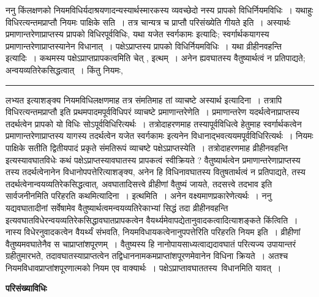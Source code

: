 \documentclass[11pt, openany]{book}
\begin{document}
 {\br ननु} किंलक्षणको नियमविधिर्यदाश्रयणादन्यस्यार्थस्मारकस्य व्यवच्छेदो
\newpage
\fancyhead[LO]{विधिः ]}
{\bl\noindent नस्य प्रापको विधिर्नियमविधिः~। यथाहुः {\qtl विधिरत्यन्तमप्राप्तौ नियमः पाक्षिके सति~। तत्र चान्यत्र च प्राप्तौ परिसंख्येति गीयते} इति~। अस्यार्थः {\qtl प्रमाणान्तरेणाप्राप्तस्य प्रापको विधिरपूर्वविधिः}, यथा {\qtl यजेत स्वर्गकामः} इत्यादिः; स्वर्गार्थकयागस्य प्रमाणान्तरेणाप्राप्तस्यानेन विधानात्~। पक्षेऽप्राप्तस्य प्रापको विधिर्नियमविधिः~। यथा {\qtl व्रीहीनवहन्ति} इत्यादिः~। कथमस्य पक्षेऽप्राप्तप्रापकत्वमिति चेत् , {\qtl इत्थम्}~। अनेन ह्यवघातस्य वैतुष्यार्थत्वं न प्रतिपाद्यते; अन्वयव्यतिरेकसिद्धत्वात्~। किंतु नियमः, \\}
\hrule
\vspace{3mm}
\noindent
लभ्यत इत्याशङ्क्य नियमविधिलक्षणमाह तत्र संमतिमाह तां व्याचष्टे {\br अस्यार्थ इत्यादिना~।}
तत्रापि {\qt विधिरत्यन्तमप्राप्तौ} इति प्रथमपादमपूर्वविधिपरं व्याचष्टे {\br प्रमाणान्तरेणेति~।} प्रमाणान्तरेण यदर्थत्वेनाप्राप्तस्य तदर्थत्वेन प्रापको यो विधिः सोऽपूर्वविधिरित्यर्थः~। तत्रोदाहरणमाह तस्यापूर्वविधित्वे हेतुमाह स्वर्गार्थकत्वेन प्रमाणान्तरेणाप्राप्तस्य यागस्य तदर्थत्वेन {\qt यजेत स्वर्गकामः} इत्यनेन विधानाद्भवत्ययमपूर्वविधिरित्यर्थः~। नियमः पाक्षिके सतीति द्वितीयपादं प्रकृते संमतिरूपं व्याचष्टे {\br पक्षेऽप्राप्तस्येति~।} तत्रोदाहरणमाह {\qt व्रीहीनवहन्ति} इत्यस्यावघातविधेः कथं पक्षेऽप्राप्तस्यावघातस्य प्रापकत्वं स्वीक्रियते ? वैतुष्यार्थत्वेन
प्रमाणान्तरेणाप्राप्तस्य तस्य तदर्थत्वेनानेन विधानोपपत्तेरित्याशङ्क्य, अनेन हि विधिनावघातस्य वितुषतार्थत्वं न प्रतिपाद्यते, तस्य तदर्थत्वेनान्वयव्यतिरेकसिद्धत्वात्, अवघातादिसत्त्वे व्रीहीणां वैतुष्यं जायते, तदसत्त्वे तदभाव इति सार्वजनीनमिति परिहरति {\br कथमित्यादिना~। इत्थमिति~।} अनेन वक्ष्यमाणप्रकारेणेत्यर्थः~। {\br ननु} यद्यवघातादीनां सर्वेषामेव वैतुष्यार्थत्वमन्वयव्यतिरेकाभ्यां सिद्धं तदा {\qt व्रीहीनवहन्ति} इत्यवघातविधेरन्वयव्यतिरेकसिद्धावघातप्रापकत्वेन वैयर्थ्यमेवापद्येतानुवादकत्वादित्याशङ्कते {\br किंत्विति~।} नास्य विधेरनुवादकत्वेन वैयर्थ्यं संभवति, नियमविधायकत्वेनानुपपत्तेरिति परिहरति {\br नियम इति~।} व्रीहीणां वैतुष्यमवघातेनैव
\newpage
\fancyhead[RE]{[परिसंख्याविधिः ] }
{\bl\noindent
स चाप्राप्तांशपूरणम्~। वैतुष्यस्य हि नानोपायसाध्यत्वाद्यदावघातं परित्यज्य उपायान्तरं ग्रहीतुमारभते, तदावघातस्याप्राप्तत्वेन तद्विधाननामकमप्राप्तांशपूरणमेवानेन विधिना क्रियते~। अतश्च नियमविधावप्राप्तांशपूरणात्मको नियम एव वाक्यार्थः~। पक्षेऽप्राप्तावघाततस्य\footnotemark\ विधानमिति यावत्~।}
\begin{center}
 \textbf{परिसंख्याविधिः}   
\end{center}
\end{document}
